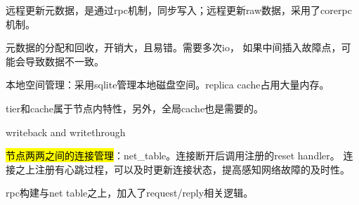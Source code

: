 远程更新元数据，是通过rpc机制，同步写入；远程更新raw数据，采用了corerpc机制。

元数据的分配和回收，开销大，且易错。需要多次io，
如果中间插入故障点，可能会导致数据不一致。

本地空间管理：采用sqlite管理本地磁盘空间。replica cache占用大量内存。

tier和cache属于节点内特性，另外，全局cache也是需要的。

writeback and writethrough

\hl{节点两两之间的连接管理}：net\_table。连接断开后调用注册的reset handler。
连接之上注册有心跳过程，可以及时更新连接状态，提高感知网络故障的及时性。

rpc构建与net table之上，加入了request/reply相关逻辑。
